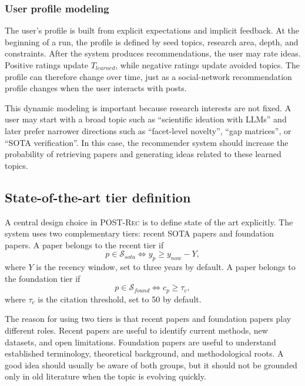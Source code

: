 \documentclass[preprint,12pt]{elsarticle}
\begin{document}
\subsubsection{User profile modeling}

The user's profile is built from explicit expectations and implicit feedback. At the beginning of a run, the profile is defined by seed topics, research area, depth, and constraints. After the system produces recommendations, the user may rate ideas. Positive ratings update $T_{learned}$, while negative ratings update avoided topics. The profile can therefore change over time, just as a social-network recommendation profile changes when the user interacts with posts.

This dynamic modeling is important because research interests are not fixed. A user may start with a broad topic such as ``scientific ideation with LLMs'' and later prefer narrower directions such as ``facet-level novelty'', ``gap matrices'', or ``SOTA verification''. In this case, the recommender system should increase the probability of retrieving papers and generating ideas related to these learned topics.

\subsection{State-of-the-art tier definition}

A central design choice in \textsc{POST-Rec} is to define state of the art explicitly. The system uses two complementary tiers: recent SOTA papers and foundation papers. A paper belongs to the recent tier if
\begin{equation}
  p \in \mathcal{S}_{sota} \Leftrightarrow y_p \geq y_{now} - Y,
\end{equation}
where $Y$ is the recency window, set to three years by default. A paper belongs to the foundation tier if
\begin{equation}
  p \in \mathcal{S}_{found} \Leftrightarrow c_p \geq \tau_c,
\end{equation}
where $\tau_c$ is the citation threshold, set to 50 by default.

The reason for using two tiers is that recent papers and foundation papers play different roles. Recent papers are useful to identify current methods, new datasets, and open limitations. Foundation papers are useful to understand established terminology, theoretical background, and methodological roots. A good idea should usually be aware of both groups, but it should not be grounded only in old literature when the topic is evolving quickly.
\end{document}
